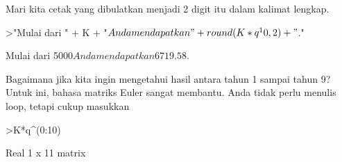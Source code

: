 \documentclass[12pt,arial,letterpaper]{book}
\begin{document}
\begin{eulernootebook}
\begin{eulercomment}
\begin{eulercomment}
\begin{eulernootebook}
\begin{eulercomment}
\begin{eulercomment}
\begin{eulercomment}
\begin{eulercomment}
\begin{eulercomment}
\begin{eulercomment}
\begin{euleroutput}
\end{euleroutput}
\begin{eulercomment}
Mari kita cetak yang dibulatkan menjadi 2 digit itu dalam kalimat
lengkap.
\end{eulercomment}
\begin{eulerprompt}
>"Mulai dari " + K + "$ Anda mendapatkan " + round(K*q^10,2) + "$."
\end{eulerprompt}
\begin{euleroutput}
  Mulai dari 5000$ Anda mendapatkan 6719.58$.
\end{euleroutput}
\begin{eulercomment}
Bagaimana jika kita ingin mengetahui hasil antara tahun 1 sampai tahun
9? Untuk ini, bahasa matriks Euler sangat membantu. Anda tidak perlu
menulis loop, tetapi cukup masukkan
\end{eulercomment}
\begin{eulerprompt}
>K*q^(0:10)
\end{eulerprompt}
\begin{euleroutput}
  Real 1 x 11 matrix
  

\end{euleroutput}
\end{eulercomment}
\end{eulercomment}
\end{eulercomment}
\end{eulercomment}
\end{eulercomment}
\end{eulercomment}
\end{eulernootebook}
\end{eulercomment}
\end{eulercomment}
\end{eulernootebook}
\end{document}
